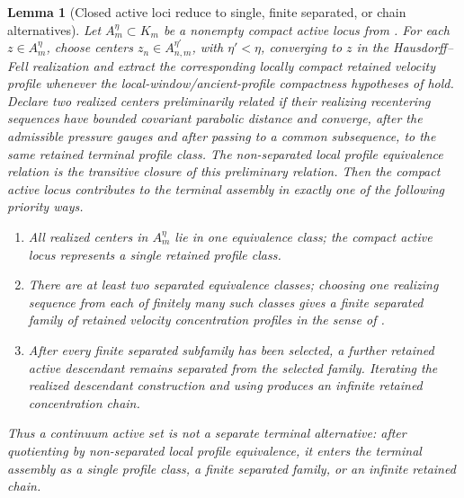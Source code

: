 \documentclass[11pt]{amsart}
\numberwithin{equation}{section}
\theoremstyle{plain}
\newtheorem{lemma}[lemma]{Lemma}
\theoremstyle{definition}
\theoremstyle{remark}
\begin{document}
\begin{lemma}[Closed active loci reduce to single, finite separated, or chain alternatives]
\label{lem:closed-active-locus-single-finite-chain}
Let \(A_m^\eta\subset K_m\) be a nonempty compact active locus from
.  For each \(z\in A_m^\eta\), choose
centers \(z_n\in A_{n,m}^{\eta'}\), with \(\eta'<\eta\), converging to \(z\)
in the Hausdorff--Fell realization and extract the corresponding locally
compact retained velocity profile whenever the local-window/ancient-profile
compactness hypotheses of  hold.  Declare two
realized centers preliminarily related if their realizing recentering sequences
have bounded covariant parabolic distance and converge, after the admissible
pressure gauges and after passing to a common subsequence, to the same retained
terminal profile class.  The non-separated local profile equivalence relation
is the transitive closure of this preliminary relation.  Then the compact active
locus contributes to the terminal assembly in exactly one of the following
priority ways.
\begin{enumerate}[label=\textup{(\roman*)}]
   \item All realized centers in \(A_m^\eta\) lie in one equivalence class; the
   compact active locus represents a single retained profile class.
   \item There are at least two separated equivalence classes; choosing one
   realizing sequence from each of finitely many such classes gives a finite
   separated family of retained velocity concentration profiles in the sense of
   .
   \item After every finite separated subfamily has been selected, a further
   retained active descendant remains separated from the selected family.
   Iterating the realized descendant construction and using
    produces an
   infinite retained concentration chain.
\end{enumerate}
Thus a continuum active set is not a separate terminal alternative: after
quotienting by non-separated local profile equivalence, it enters the terminal
assembly as a single profile class, a finite separated family, or an infinite
retained chain.
\end{lemma}
\end{document}
